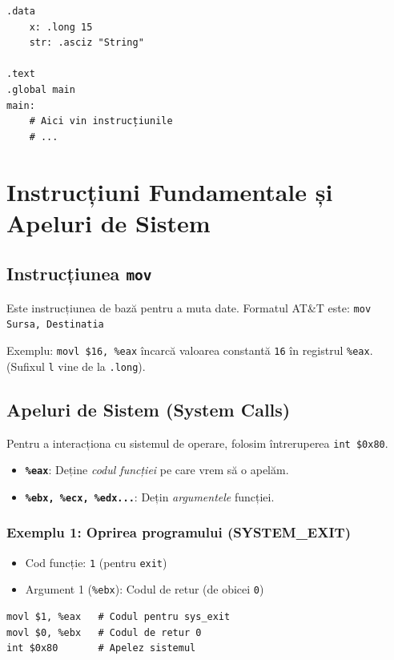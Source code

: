 \documentclass[12pt]{article}
\begin{document}
\begin{lstlisting}[language=x86asm, caption={Structura de bază a unui program}]
.data
    x: .long 15
    str: .asciz "String"

.text
.global main
main:
    # Aici vin instrucțiunile
    # ...
\end{lstlisting}

\section{Instrucțiuni Fundamentale și Apeluri de Sistem}

\subsection{Instrucțiunea \texttt{mov}}
Este instrucțiunea de bază pentru a muta date. Formatul AT\&T este:
\texttt{mov Sursa, Destinatia}

Exemplu: \texttt{movl \$16, \%eax} încarcă valoarea constantă \texttt{16} în registrul \texttt{\%eax}. (Sufixul \texttt{l} vine de la \texttt{.long}).

\subsection{Apeluri de Sistem (System Calls)}
Pentru a interacționa cu sistemul de operare, folosim întreruperea \texttt{int \$0x80}.
\begin{itemize}
    \item \textbf{\texttt{\%eax}}: Deține \textit{codul funcției} pe care vrem să o apelăm.
    \item \textbf{\texttt{\%ebx, \%ecx, \%edx...}}: Dețin \textit{argumentele} funcției.
\end{itemize}

\subsubsection{Exemplu 1: Oprirea programului (SYSTEM\_EXIT)}
\begin{itemize}
    \item Cod funcție: \texttt{1} (pentru \texttt{exit})
    \item Argument 1 (\texttt{\%ebx}): Codul de retur (de obicei \texttt{0})
\end{itemize}
\begin{lstlisting}[language=x86asm]
movl $1, %eax   # Codul pentru sys_exit
movl $0, %ebx   # Codul de retur 0
int $0x80       # Apelez sistemul
\end{lstlisting}
\end{document}
